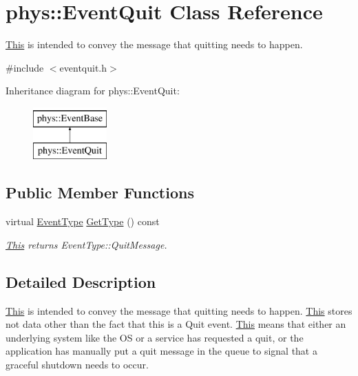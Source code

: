 \hypertarget{classphys_1_1EventQuit}{
\section{phys::EventQuit Class Reference}
\label{dd/dea/classphys_1_1EventQuit}
}


\hyperlink{structThis}{This} is intended to convey the message that quitting needs to happen.  




{\ttfamily \#include $<$eventquit.h$>$}

Inheritance diagram for phys::EventQuit:\begin{figure}[H]
\begin{center}
\leavevmode
\includegraphics[height=2cm]{dd/dea/classphys_1_1EventQuit}
\end{center}
\end{figure}
\subsection*{Public Member Functions}
\begin{DoxyCompactItemize}
\item 
virtual \hyperlink{classphys_1_1EventBase_a5e6a8564e127f654123f0bf6a2751923}{EventType} \hyperlink{classphys_1_1EventQuit_a3bfca875349e73dbda47c3c62a253e3b}{GetType} () const 
\begin{DoxyCompactList}\small\item\em \hyperlink{structThis}{This} returns EventType::QuitMessage. \item\end{DoxyCompactList}\end{DoxyCompactItemize}


\subsection{Detailed Description}
\hyperlink{structThis}{This} is intended to convey the message that quitting needs to happen. \hyperlink{structThis}{This} stores not data other than the fact that this is a Quit event. \hyperlink{structThis}{This} means that either an underlying system like the OS or a service has requested a quit, or the application has manually put a quit message in the queue to signal that a graceful shutdown needs to occur. 

